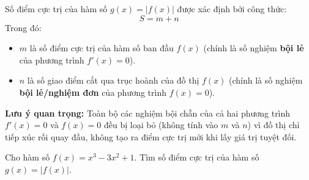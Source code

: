 \documentclass[12pt]{article}
\begin{document}
	\begin{tcolorbox}[colback=blue!5!white, colframe=blue!60!black, title=Công thức đếm nhanh cực trị]
		Số điểm cực trị của hàm số $g(x) = |f(x)|$ được xác định bởi công thức:
		$$S = m + n$$
		Trong đó:
		\begin{itemize}
			\item $m$ là số điểm cực trị của hàm số ban đầu $f(x)$ (chính là số nghiệm \textbf{bội lẻ} của phương trình $f'(x) = 0$).
			\item $n$ là số giao điểm cắt qua trục hoành của đồ thị $f(x)$ (chính là số nghiệm \textbf{bội lẻ/nghiệm đơn} của phương trình $f(x) = 0$).
		\end{itemize}
		\textbf{Lưu ý quan trọng:} Toàn bộ các nghiệm bội chẵn của cả hai phương trình $f'(x) = 0$ và $f(x) = 0$ đều bị loại bỏ (không tính vào $m$ và $n$) vì đồ thị chỉ tiếp xúc rồi quay đầu, không tạo ra điểm cực trị mới khi lấy giá trị tuyệt đối.
	\end{tcolorbox}
	
	\begin{vidu}[2]
		Cho hàm số $f(x) = x^3 - 3x^2 + 1$. Tìm số điểm cực trị của hàm số $g(x) = |f(x)|$.
	\end{vidu}
	
\end{document}

